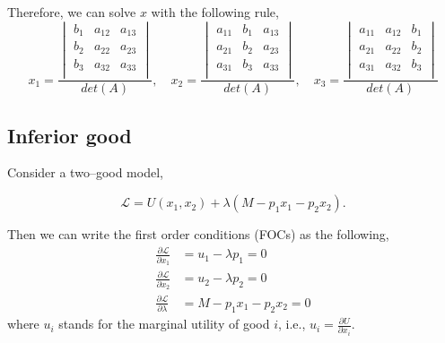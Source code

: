\documentclass[12pt]{article}
\begin{document}
Therefore, we can solve $ x $ with the following rule,
\begin{equation}
				x_1 = 
				\frac{
								\begin{vmatrix}
								b_1		&a_{12}		&a_{13} \\
								b_2		&a_{22}		&a_{23} \\
								b_3		&a_{32}		&a_{33} \\
								\end{vmatrix}
				}{det(A)}, \quad
				x_2 = 
				\frac{
								\begin{vmatrix}
								a_{11}		&b_1		&a_{13} \\
								a_{21}		&b_2		&a_{23} \\
								a_{31}		&b_3		&a_{33} \\
								\end{vmatrix}
				}{det(A)}, \quad
				x_3 = 
				\frac{
								\begin{vmatrix}
								a_{11}		&a_{12}		&b_1 \\
								a_{21}		&a_{22}		&b_2 \\
								a_{31}		&a_{32}		&b_3 \\
								\end{vmatrix}
				}{det(A)}
\end{equation}






\subsection{Inferior good}

Consider a two--good model,

\begin{equation}
				\mathscr{L} = U(x_1, x_2) + \lambda (M - p_1x_1 - p_2x_2).
\end{equation}

Then we can write the first order conditions (FOCs) as the following,
\begin{align}
				\frac{\partial \mathscr{L} }{\partial x_1 } &= u_1 - \lambda p_1 = 0\\
				\frac{\partial \mathscr{L} }{\partial x_2 } &= u_2 - \lambda p_2 = 0\\
				\frac{\partial \mathscr{L} }{\partial \lambda  } &=
				M - p_1x_1 - p_2x_2 = 0
\end{align}
where $ u_{i} $ stands for the marginal utility of good $ i $, i.e., 
$ u_{i} = \frac{\partial U }{\partial x_{i} } $.
\end{document}
